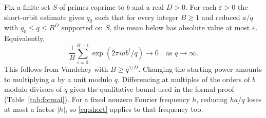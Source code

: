 \documentclass[11pt]{article}
\newcommand{\ee}[1]{\exp(2\pi i #1)}
\begin{document}
Fix a finite set $S$ of primes coprime to $b$ and a real $D>0$.
For each $\varepsilon>0$ the short-orbit estimate gives $q_0$ such that for every
integer $B\ge1$ and reduced $a/q$ with $q_0\le q\le B^D$ supported on $S$,
the mean below has absolute value at most $\varepsilon$. Equivalently,
\begin{equation}\label{eq:short}
 \frac1B\sum_{i=0}^{B-1}\ee{a b^i/q}\longrightarrow0
 \quad\text{as }q\longrightarrow\infty .
\end{equation}
This follows from Vandehey \cite[Corollary 1.2 in the preprint]{vandehey} with $B\ge q^{1/D}$.
Changing the starting power amounts to multiplying $a$ by a unit modulo $q$.
Differencing at multiples of the orders of $b$ modulo divisors of $q$ gives the
qualitative bound used in the formal proof (Table~\ref{tab:formal}). For a fixed nonzero Fourier frequency $h$,
reducing $ha/q$ loses at most a factor $|h|$, so \eqref{eq:short} applies to that frequency too.
\end{document}
